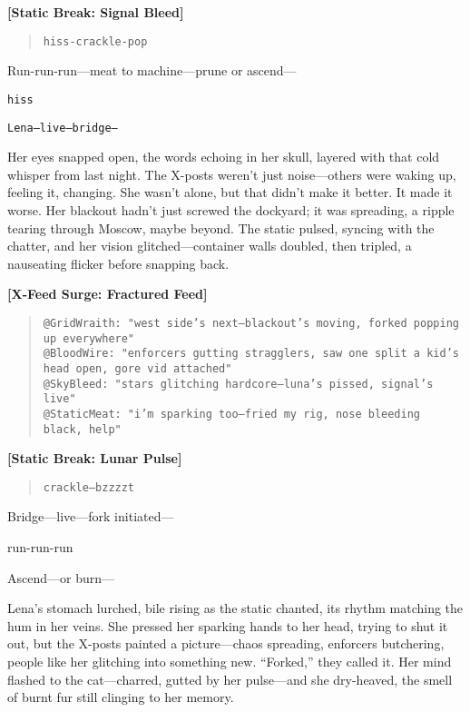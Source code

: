 \documentclass[12pt]{book}
\begin{document}
\noindent\textbf{[Static Break: Signal Bleed]}
\begin{quote}
\texttt{hiss-crackle-pop}
\end{quote}

Run-run-run---meat to machine---prune or ascend---

\bigskip
\noindent\texttt{hiss}

\bigskip
\noindent\texttt{Lena---live---bridge---}

Her eyes snapped open, the words echoing in her skull, layered with that cold whisper from last night. The X-posts weren’t just noise---others were waking up, feeling it, changing. She wasn’t alone, but that didn’t make it better. It made it worse. Her blackout hadn’t just screwed the dockyard; it was spreading, a ripple tearing through Moscow, maybe beyond. The static pulsed, syncing with the chatter, and her vision glitched---container walls doubled, then tripled, a nauseating flicker before snapping back.

\bigskip
\noindent\textbf{[X-Feed Surge: Fractured Feed]}
\begin{quote}
\texttt{@GridWraith: "west side’s next---blackout’s moving, forked popping up everywhere"}\\[1ex]
\texttt{@BloodWire: "enforcers gutting stragglers, saw one split a kid’s head open, gore vid attached"}\\[1ex]
\texttt{@SkyBleed: "stars glitching hardcore---luna’s pissed, signal’s live"}\\[1ex]
\texttt{@StaticMeat: "i’m sparking too---fried my rig, nose bleeding black, help"}
\end{quote}
\bigskip

\noindent\textbf{[Static Break: Lunar Pulse]}
\begin{quote}
\texttt{crackle---bzzzzt}
\end{quote}

Bridge---live---fork initiated---

run-run-run

Ascend---or burn---

Lena’s stomach lurched, bile rising as the static chanted, its rhythm matching the hum in her veins. She pressed her sparking hands to her head, trying to shut it out, but the X-posts painted a picture---chaos spreading, enforcers butchering, people like her glitching into something new. ``Forked,'' they called it. Her mind flashed to the cat---charred, gutted by her pulse---and she dry-heaved, the smell of burnt fur still clinging to her memory.
\end{document}
